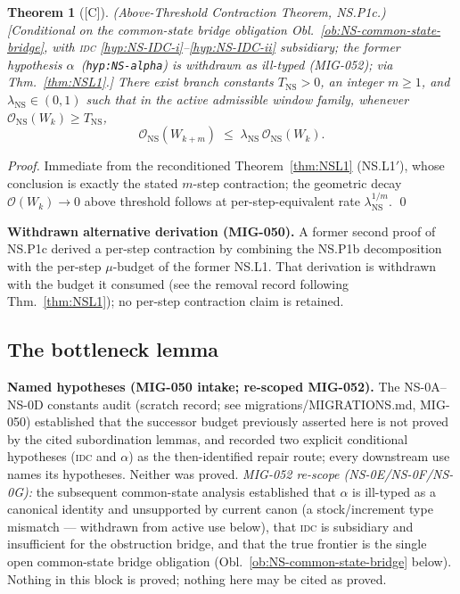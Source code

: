 \documentclass[12pt,oneside]{amsbook}
\theoremstyle{plain}
\newtheorem{theorem}{Theorem}[section]
\theoremstyle{definition}
\theoremstyle{remark}
\newcommand{\status}[1]{\textup{[#1]}}
\begin{document}
\begin{theorem}[\status{C}]\label{thm:NSP1c}
\textup{(Above-Threshold Contraction Theorem, NS.P1c.)}
\textup{[Conditional on the common-state bridge obligation
Obl.~\ref{ob:NS-common-state-bridge}, with \textsc{idc}
\eqref{hyp:NS-IDC-i}--\eqref{hyp:NS-IDC-ii} subsidiary; the former
hypothesis $\alpha$~(\texttt{hyp:NS-alpha}) is withdrawn as ill-typed
(MIG-052); via Thm.~\ref{thm:NSL1}.]}
There exist branch constants $T_{\mathrm{NS}} > 0$, an integer
$m \geq 1$, and $\lambda_{\mathrm{NS}} \in (0,1)$ such that in
the active admissible window family, whenever
$\mathcal{O}_{\mathrm{NS}}(W_k) \geq T_{\mathrm{NS}}$,
\[
 \mathcal{O}_{\mathrm{NS}}(W_{k+m})
 \;\leq\;
 \lambda_{\mathrm{NS}}\,\mathcal{O}_{\mathrm{NS}}(W_k).
\]
\end{theorem}
\begin{proof}
Immediate from the reconditioned Theorem~\ref{thm:NSL1} (NS.L1$'$),
whose conclusion is exactly the stated $m$-step contraction; the
geometric decay $\mathcal{O}(W_k) \to 0$ above threshold follows at
per-step-equivalent rate $\lambda_{\mathrm{NS}}^{1/m}$. \qed
\end{proof}


\medskip\noindent\textbf{Withdrawn alternative derivation
(MIG-050).} A former second proof of NS.P1c derived a per-step
contraction by combining the NS.P1b decomposition with the per-step
$\mu$-budget of the former NS.L1. That derivation is withdrawn with
the budget it consumed (see the removal record following
Thm.~\ref{thm:NSL1}); no per-step contraction claim is retained.

\subsection{The bottleneck lemma}

\medskip\noindent\textbf{Named hypotheses (MIG-050 intake;
re-scoped MIG-052).} The NS-0A--NS-0D constants audit (scratch
record; see migrations/MIGRATIONS.md, MIG-050) established that the
successor budget previously asserted here is not proved by the cited
subordination lemmas, and recorded two explicit conditional
hypotheses (\textsc{idc} and $\alpha$) as the then-identified
repair route; every downstream use names its hypotheses. Neither
was proved. \emph{MIG-052 re-scope (NS-0E/NS-0F/NS-0G):} the
subsequent common-state analysis established that $\alpha$ is
ill-typed as a canonical identity and unsupported by current canon
(a stock/increment type mismatch --- withdrawn from active use
below),
that \textsc{idc} is subsidiary and insufficient for the
obstruction bridge, and that the true frontier is the single open
common-state bridge obligation
(Obl.~\ref{ob:NS-common-state-bridge} below). Nothing in this block
is proved; nothing here may be cited as proved.
\end{document}
